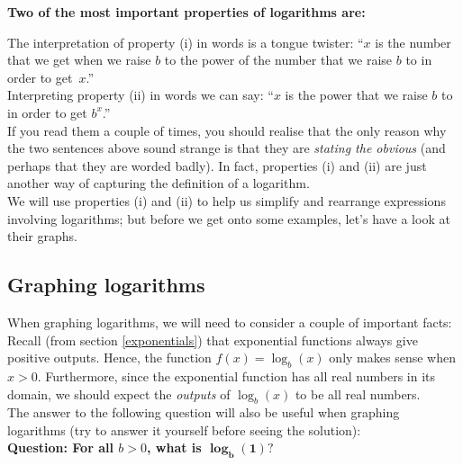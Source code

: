\noindent \textbf{Two of the most important properties of logarithms are:} \label{log2properties} \label{symbln} \\

	\bigskip
	
	\hfil{}
	\bigskip
	\bigskip
	
\noindent The interpretation of property (i) in words is a tongue twister: ``$x$ is the number that we get when we raise $b$ to the power of the number that we raise $b$ to in order to get~$x$.'' \\

\noindent Interpreting property (ii) in words we can say: ``$x$ is the power that we raise $b$ to in order to get $b^x$.'' \\

\noindent If you read them a couple of times, you should realise that the only reason why the two sentences above sound strange is that they are \textit{stating the obvious} (and perhaps that they are worded badly). In fact, properties (i) and (ii) are just another way of capturing the definition of a logarithm. \\

\noindent We will use properties (i) and (ii) to help us simplify and rearrange expressions involving logarithms; but before we get onto some examples, let's have a look at their graphs.

\subsection{Graphing logarithms}

\noindent When graphing logarithms, we will need to consider a couple of important facts: Recall (from section \ref{exponentials}) that exponential functions always give positive outputs. Hence, the function $f(x) = \log_b(x)$ only makes sense when $x > 0$. Furthermore, since the exponential function has all real numbers in its domain, we should expect the \textit{outputs} of $\log_b(x)$ to be all real numbers. \\

\noindent The answer to the following question will also be useful when graphing logarithms (try to answer it yourself before seeing the solution): \\
\noindent \textbf{Question: For all $b > 0$, what is $\boldsymbol{\log_b(1)?}$} \\ \\

